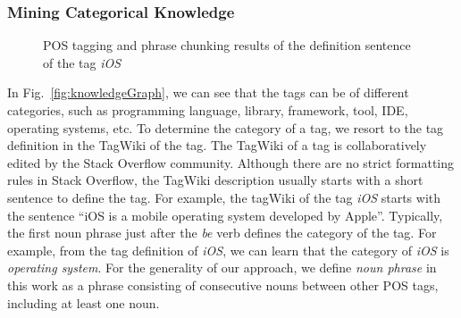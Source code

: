 \subsubsection{Mining Categorical Knowledge}

\label{sec:categoryKG}

\begin{figure}
	\centering
	\caption{POS tagging and phrase chunking results of the definition sentence of the tag \textit{iOS}}
	\label{fig:exampleChunking}
\end{figure}


In Fig.~\ref{fig:knowledgeGraph}, we can see that the tags can be of different categories, such as programming language, library, framework, tool, IDE, operating systems, etc.
To determine the category of a tag, we resort to the tag definition in the TagWiki of the tag.
The TagWiki of a tag is collaboratively edited by the Stack Overflow community.
Although there are no strict formatting rules in Stack Overflow, the TagWiki description usually starts with a short sentence to define the tag.
For example, the tagWiki of the tag \textit{iOS} starts with the sentence ``iOS is a mobile operating system developed by Apple''.
Typically, the first noun phrase just after the \textit{be} verb defines the category of the tag.
For example, from the tag definition of \textit{iOS}, we can learn that the category of \textit{iOS} is \textit{operating system}.
For the generality of our approach, we define \textit{noun phrase} in this work as a phrase consisting of consecutive nouns between other POS tags, including at least one noun.




